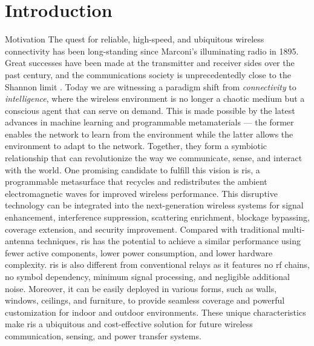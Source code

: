 
\graphicspath{{assets/chapter_1/}}

\chapter{Introduction}

\begin{section}{Motivation}
	The quest for reliable, high-speed, and ubiquitous wireless connectivity has been long-standing since Marconi's illuminating radio in 1895.
	Great successes have been made at the transmitter and receiver sides over the past century, and the communications society is unprecedentedly close to the Shannon limit \cite{Shannon1948}.
	Today we are witnessing a paradigm shift from \emph{connectivity} to \emph{intelligence}, where the wireless environment is no longer a chaotic medium but a conscious agent that can serve on demand.
	This is made possible by the latest advances in machine learning and programmable metamaterials --- the former enables the network to learn from the environment while the latter allows the environment to adapt to the network.
	Together, they form a symbiotic relationship that can revolutionize the way we communicate, sense, and interact with the world.
	One promising candidate to fulfill this vision is \gls{ris}, a programmable metasurface that recycles and redistributes the ambient electromagnetic waves for improved wireless performance.
	This disruptive technology can be integrated into the next-generation wireless systems for signal enhancement, interference suppression, scattering enrichment, blockage bypassing, coverage extension, and security improvement.
	Compared with traditional multi-antenna techniques, \gls{ris} has the potential to achieve a similar performance using fewer active components, lower power consumption, and lower hardware complexity.
	\gls{ris} is also different from conventional relays as it features no \gls{rf} chains, no symbol dependency, minimum signal processing, and negligible additional noise.
	Moreover, it can be easily deployed in various forms, such as walls, windows, ceilings, and furniture, to provide seamless coverage and powerful customization for indoor and outdoor environments.
	These unique characteristics make \gls{ris} a ubiquitous and cost-effective solution for future wireless communication, sensing, and power transfer systems.


\end{section}
